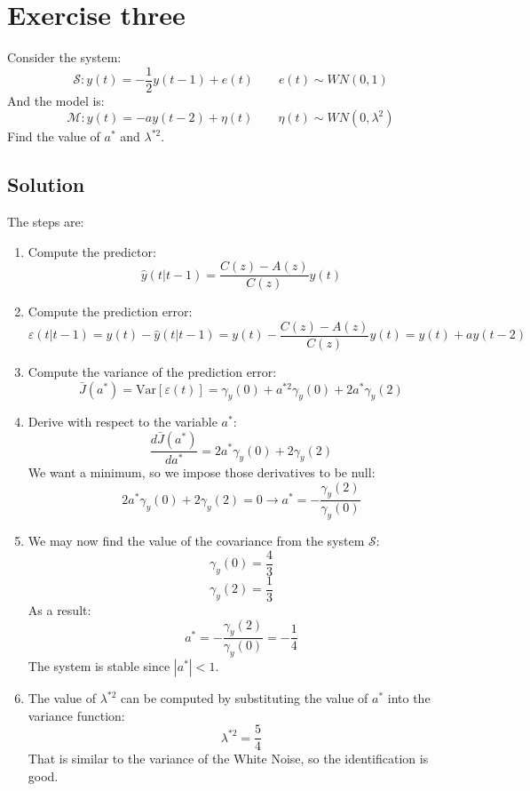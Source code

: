 \section{Exercise three}

Consider the system: 
\[\mathcal{S}:y(t)=-\dfrac{1}{2}y(t-1)+e(t) \qquad e(t)\sim WN(0,1)\]
And the model is: 
\[\mathcal{M}:y(t)=-ay(t-2)+\eta(t) \qquad \eta(t)\sim WN(0,\lambda^2)\]
Find the value of $a^\ast$ and $\lambda^{\ast 2}$. 

\subsection*{Solution}
The steps are: 
\begin{enumerate}
    \item Compute the predictor: 
        \[\hat{y}(t|t-1)=\dfrac{C(z)-A(z)}{C(z)}y(t)\]
    \item Compute the prediction error: 
        \[\varepsilon(t|t-1)=y(t)-\hat{y}(t|t-1)=y(t)-\dfrac{C(z)-A(z)}{C(z)}y(t)=y(t)+ay(t-2)\]
    \item Compute the variance of the prediction error: 
        \[\bar{J}(a^\ast)=\text{Var}\left[\varepsilon(t)\right]=\gamma_y(0)+a^{\ast 2}\gamma_y(0)+2a^\ast \gamma_y(2)\]
    \item Derive with respect to the variable $a^\ast$: 
        \[\dfrac{d\bar{J}(a^\ast)}{d a^\ast}=2a^\ast\gamma_y(0)+2\gamma_y(2)\]
        We want a minimum, so we impose those derivatives to be null: 
        \[2a^\ast\gamma_y(0)+2\gamma_y(2)=0 \rightarrow a^\ast=-\dfrac{\gamma_y(2)}{\gamma_y(0)}\]
    \item We may now find the value of the covariance from the system $\mathcal{S}$: 
        \[\gamma_y(0)=\dfrac{4}{3}\]
        \[\gamma_y(2)=\dfrac{1}{3}\]
        As a result: 
        \[a^\ast=-\dfrac{\gamma_y(2)}{\gamma_y(0)}=-\dfrac{1}{4}\]
        The system is stable since $\left\lvert a^\ast \right\rvert<1$. 
    \item The value of $\lambda^{\ast 2}$ can be computed by substituting the value of $a^\ast$ into the variance function: 
        \[\lambda^{\ast 2}=\dfrac{5}{4}\]
        That is similar to the variance of the White Noise, so the identification is good. 
\end{enumerate}